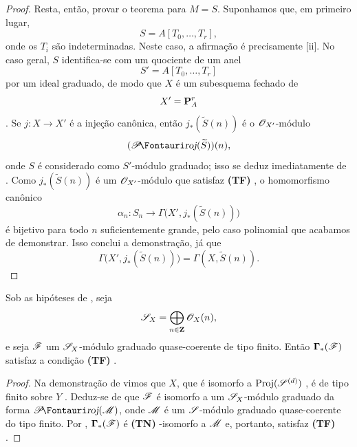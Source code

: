 \begin{proof}
Resta, então, provar o teorema para $M=S$.
Suponhamos que, em primeiro lugar,
\[
  S=A[T_0,\ldots,T_r],
\]
onde os $T_i$ são indeterminadas.
Neste caso, a afirmação é precisamente [ii].
No caso geral, $S$ identifica-se com um quociente de um anel
\[
  S'=A[T_0,\ldots,T_r]
\]
por um ideal graduado, de modo que $X$ é um subesquema fechado de
\[
  X'=\mathbf{P}_A^r
\]
.
Se $j:X\to X'$ é a injeção canônica, então $j_*(\widetilde{S}(n))$ é o $\mathscr{O}_{X'}$-módulo
\[
  (\shProj(\widetilde{S}))(n),
\]
onde $S$ é considerado como $S'$-módulo graduado; isso se deduz imediatamente de .
Como $j_*(\widetilde{S}(n))$ é um $\mathscr{O}_{X'}$-módulo que satisfaz \textbf{(TF) }, o homomorfismo canônico
\[
  \alpha_n:S_n\longrightarrow
  \Gamma\bigl(X',j_*(\widetilde{S}(n))\bigr)
\]
é bijetivo para todo $n$ suficientemente grande, pelo caso polinomial que acabamos de demonstrar.
Isso conclui a demonstração, já que
\[
  \Gamma\bigl(X',j_*(\widetilde{S}(n))\bigr)
  =\Gamma(X,\widetilde{S}(n)).
\]
\end{proof}

\begin{corollary}[2.3.2]
\label{III.2.3.2}
Sob as hipóteses de , seja
\[
  \mathscr{S}_X=\bigoplus_{n\in\mathbf{Z}}\mathscr{O}_X(n),
\]
e seja $\mathscr{F}$ um $\mathscr{S}_X$-módulo graduado quase-coerente de tipo finito.
Então $\boldsymbol\Gamma_*(\mathscr{F})$ satisfaz a condição \textbf{(TF) }.
\end{corollary}

\begin{proof}
Na demonstração de  vimos que $X$, que é isomorfo a $\operatorname{Proj}(\mathscr{S}^{(d)})$ , é de tipo finito sobre $Y$ .
Deduz-se de  que $\mathscr{F}$ é isomorfo a um $\mathscr{S}_X$-módulo graduado da forma $\shProj(\sh{M})$, onde $\mathscr{M}$ é um $\mathscr{S}$-módulo graduado quase-coerente do tipo finito.
Por , $\boldsymbol\Gamma_*(\mathscr{F})$ é \textbf{(TN) }-isomorfo a $\mathscr{M}$ e, portanto, satisfaz \textbf{(TF) }.
\end{proof}

